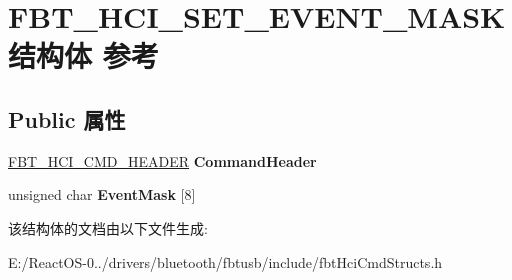 \hypertarget{struct_f_b_t___h_c_i___s_e_t___e_v_e_n_t___m_a_s_k}{}\section{F\+B\+T\+\_\+\+H\+C\+I\+\_\+\+S\+E\+T\+\_\+\+E\+V\+E\+N\+T\+\_\+\+M\+A\+S\+K结构体 参考}
\label{struct_f_b_t___h_c_i___s_e_t___e_v_e_n_t___m_a_s_k}
\subsection*{Public 属性}
\begin{DoxyCompactItemize}
\item 
\mbox{\label{struct_f_b_t___h_c_i___s_e_t___e_v_e_n_t___m_a_s_k_abf442c7d451132db8982b16b9663705d}} 
\hyperlink{struct_f_b_t___h_c_i___c_m_d___h_e_a_d_e_r}{F\+B\+T\+\_\+\+H\+C\+I\+\_\+\+C\+M\+D\+\_\+\+H\+E\+A\+D\+ER} {\bfseries Command\+Header}
\item 
\mbox{\label{struct_f_b_t___h_c_i___s_e_t___e_v_e_n_t___m_a_s_k_a7ba1380e760d79e985bcea2b6144ea5e}} 
unsigned char {\bfseries Event\+Mask} \mbox{[}8\mbox{]}
\end{DoxyCompactItemize}


该结构体的文档由以下文件生成\+:\begin{DoxyCompactItemize}
\item 
E\+:/\+React\+O\+S-\/0../drivers/bluetooth/fbtusb/include/fbt\+Hci\+Cmd\+Structs.\+h\end{DoxyCompactItemize}
